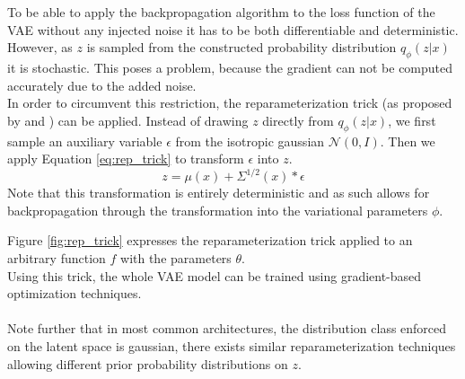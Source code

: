 To be able to apply the backpropagation\cite{backprop:1988} algorithm to the loss function of the VAE without any injected noise it has to be both differentiable and deterministic.
However, as $z$ is sampled from the constructed probability distribution $q_\phi(z|x)$ it is stochastic.
This poses a problem, because the gradient can not be computed accurately due to the added noise.\\
In order to circumvent this restriction, the reparameterization trick (as proposed by \cite{vae:2014} and \cite{dlgm:2014}) can be applied.
Instead of drawing $z$ directly from $q_\phi(z|x)$, we first sample an auxiliary variable $\epsilon$ from the isotropic gaussian $\mathcal{N}(0, I)$. Then we apply Equation \ref{eq:rep_trick} to transform $\epsilon$ into $z$.
\begin{equation}
  \label{eq:rep_trick}
  z = \mu(x) + \Sigma^{1/2}(x)*\epsilon
\end{equation}
Note that this transformation is entirely deterministic and as such allows for backpropagation through the transformation into the variational parameters $\phi$.

Figure \ref{fig:rep_trick} expresses the reparameterization trick applied to an arbitrary function $f$ with the parameters $\theta$.\\
Using this trick, the whole VAE model can be trained using gradient-based optimization techniques.\\\\

Note further that in most common architectures, the distribution class enforced on the latent space is gaussian, there exists similar reparameterization techniques allowing different prior probability distributions on $z$.








